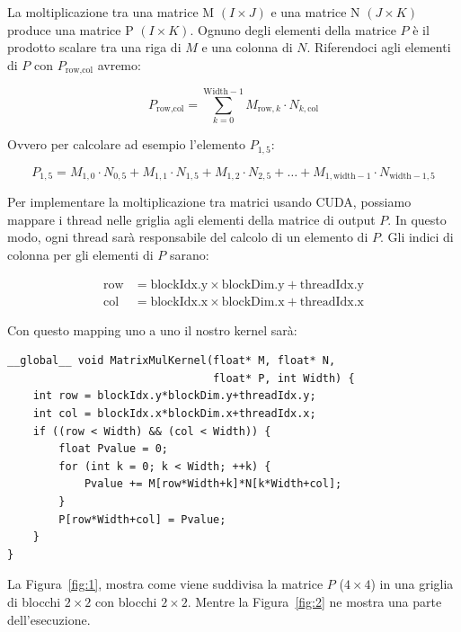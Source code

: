\documentclass[a4paper]{article}
\begin{document}
La moltiplicazione tra una matrice M $(I\times{J})$ e una matrice N $(J\times{K})$ produce una matrice P $(I\times{K})$. Ognuno degli elementi della matrice $P$ è il prodotto scalare tra una riga di $M$ e una colonna di $N$. Riferendoci agli elementi di $P$ con $P_{\text{row}, \text{col}}$ avremo:

\[
    P_{\text{row}, \text{col}} = \sum_{k=0}^{\text{Width}-1} M_{\text{row}, k} \cdot N_{k, \text{col}}
\]

Ovvero per calcolare ad esempio l'elemento $P_{1, 5}$:

\[
    P_{1,5} = M_{1,0} \cdot N_{0,5} + M_{1,1} \cdot N_{1,5} + M_{1,2} \cdot N_{2,5} + \ldots + M_{1,\text{width}-1} \cdot N_{\text{width}-1,5}
\]

Per implementare la moltiplicazione tra matrici usando CUDA, possiamo mappare i thread nelle griglia agli elementi della matrice di output $P$. In questo modo, ogni thread sarà responsabile del calcolo di un elemento di $P$. Gli indici di colonna per gli elementi di $P$ sarano:

\[
    \begin{aligned}
        \text{row} & = \text{blockIdx.y} \times \text{blockDim.y} + \text{threadIdx.y} \\
        \text{col} & = \text{blockIdx.x} \times \text{blockDim.x} + \text{threadIdx.x}
    \end{aligned}
\]

Con questo mapping uno a uno il nostro kernel sarà:

\begin{lstlisting}[caption={Kernel CUDA con memoria globale}, label={lst:1}]
__global__ void MatrixMulKernel(float* M, float* N,
                                float* P, int Width) {
    int row = blockIdx.y*blockDim.y+threadIdx.y;
    int col = blockIdx.x*blockDim.x+threadIdx.x;
    if ((row < Width) && (col < Width)) {
        float Pvalue = 0;
        for (int k = 0; k < Width; ++k) {
            Pvalue += M[row*Width+k]*N[k*Width+col];
        }
        P[row*Width+col] = Pvalue;
    }
}
\end{lstlisting}

\newpage

La Figura~\ref{fig:1}, mostra come viene suddivisa la matrice $P$ ($4\times{4}$) in una griglia di blocchi $2\times{2}$ con blocchi $2\times{2}$. Mentre la Figura~\ref{fig:2} ne mostra una parte dell'esecuzione.
\end{document}
